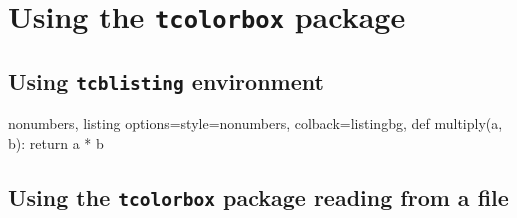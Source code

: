 \section{Using the \texttt{tcolorbox} package}
\subsection{Using \texttt{tcblisting} environment}
\lstset{inputpath=.}

\begin{tcblisting}{
    nonumbers,
    listing options={style=nonumbers},
    colback=listingbg,
}
def multiply(a, b):
    return a * b
\end{tcblisting}

\subsection{Using the \texttt{tcolorbox} package reading from a file}

